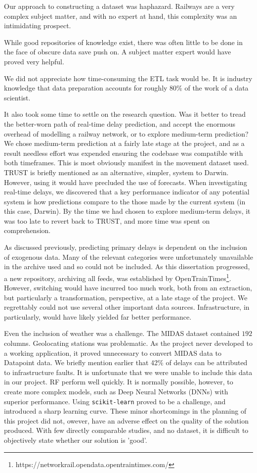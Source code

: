 \documentclass[12pt,a4paper]{article}
\begin{document}
Our approach to constructing a dataset was haphazard. Railways are a very complex subject matter, and with no expert at hand, this complexity was an intimidating prospect. 

While good repositories of knowledge exist, there was often little to be done in the face of obscure data save push on. A subject matter expert would have proved very helpful.

We did not appreciate how time-consuming the ETL task would be. It is industry knowledge that data preparation accounts for roughly $80\%$ of the work of a data scientist. 


It also took some time to settle on the research question. Was it better to tread the better-worn path of real-time delay prediction, and accept the enormous overhead of modelling a railway network, or to explore medium-term prediction? We chose medium-term prediction at a fairly late stage at the project, and as a result needless effort was expended ensuring the codebase was compatible with both timeframes. This is most obviously manifest in the movement dataset used. TRUST is briefly mentioned as an alternative, simpler, system to Darwin. However, using it would have precluded the use of forecasts. When investigating real-time delays, we discovered that a key performance indicator of any potential system is how predictions compare to the those made by the current system (in this case, Darwin). By the time we had chosen to explore medium-term delays, it was too late to revert back to TRUST, and more time was spent on comprehension.

As discussed previously, predicting primary delays is dependent on the inclusion of exogenous data. Many of the relevant categories were unfortunately unavailable in the archive used and so could not be included. As this dissertation progressed, a new repository, archiving all feeds, was established by OpenTrainTimes\footnote{https://networkrail.opendata.opentraintimes.com/}. However, switching would have incurred too much work, both from an extraction, but particularly a transformation, perspective, at a late stage of the project. We regrettably could not use several other important data sources. Infrastructure, in particularly, would have likely yielded far better performance.

Even the inclusion of weather was a challenge. The MIDAS dataset contained $192$ columns. Geolocating stations was problematic. As the project never developed to a working application, it proved unnecessary to convert MIDAS data to Datapoint data. We briefly mention earlier that 42\% of delays can be attributed to infrastructure faults. It is unfortunate that we were unable to include this data in our project. RF perform well quickly. It is normally possible, however, to create more complex models, such as Deep Neural Networks (DNNs) with superior performance. Using \verb|scikit-learn| proved to be a challenge, and introduced a sharp learning curve. These minor shortcomings in the planning of this project did not, owever, have an adverse effect on the quality of the solution produced. With few directly comparable studies, and no dataset, it is difficult to objectively state whether our solution is 'good'. 
\end{document}

